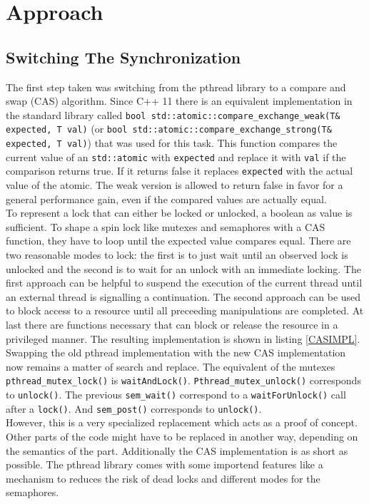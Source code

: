 \chapter{Approach}

\section{Switching The Synchronization}
The first step taken was switching from the pthread library to a compare and swap (CAS) algorithm. Since C++ 11 there is an equivalent implementation in the standard library called \texttt{bool std::atomic::compare\_exchange\_weak(T\& expected, T val)} (or \texttt{bool std::atomic::compare\_exchange\_strong(T\& expected, T val)}) that was used for this task. This function compares the current value of an \texttt{std::atomic} with \texttt{expected} and replace it with \texttt{val} if the comparison returns true. If it returns false it replaces \texttt{expected} with the actual value of the atomic. The weak version is allowed to return false in favor for a general performance gain, even if the compared values are actually equal.\\
To represent a lock that can either be locked or unlocked, a boolean as value is sufficient. To shape a spin lock like mutexes and semaphores with a CAS function, they have to loop until the expected value compares equal. There are two reasonable modes to lock: the first is to just wait until an observed lock is unlocked and the second is to wait for an unlock with an immediate locking. The first approach can be helpful to suspend the execution of the current thread until an external thread is signalling a continuation. The second approach can be used to block access to a resource until all preceeding manipulations are completed. At last there are functions necessary that can block or release the resource in a privileged manner. The resulting implementation is shown in listing \ref{CASIMPL}.\\
Swapping the old pthread implementation with the new CAS implementation now remains a matter of search and replace. The equivalent of the mutexes \texttt{pthread\_mutex\_lock()} is \texttt{waitAndLock()}. \texttt{Pthread\_mutex\_unlock()} corresponds to \texttt{unlock()}. The previous \texttt{sem\_wait()} correspond to a \texttt{waitForUnlock()} call after a \texttt{lock()}. And \texttt{sem\_post()} corresponds to \texttt{unlock()}.\\
However, this is a very specialized replacement which acts as a proof of concept. Other parts of the code might have to be replaced in another way, depending on the semantics of the part. Additionally the CAS implementation is as short as possible. The pthread library comes with some importend features like a mechanism to reduces the risk of dead locks and different modes for the semaphores.

